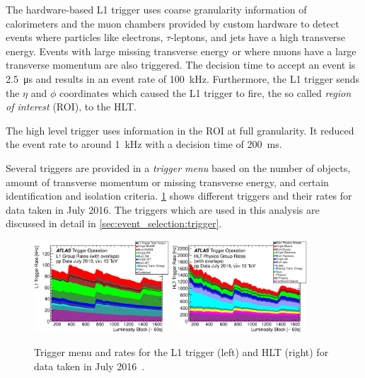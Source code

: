 The hardware-based L1 trigger uses coarse granularity information of calorimeters and the muon chambers provided by custom hardware
to detect events where particles like electrons, $\tau$-leptons, and jets have a high transverse energy.
Events with large missing transverse energy or where muons have a large transverse momentum are also triggered.
The decision time to accept an event is \SI{2.5}{\us} and results in an event rate of \SI{100}{\kHz}.
Furthermore, the L1 trigger sends the $\eta$ and $\phi$ coordinates which caused the L1 trigger to fire,
the so called \emph{region of interest} (ROI), to the HLT\@.

The high level trigger uses information in the ROI at full granularity.
It reduced the event rate to around \SI{1}{\kHz} with a decision time of \SI{200}{\ms}.

Several triggers are provided in a \emph{trigger menu} based on the number of objects,
amount of transverse momentum or missing transverse energy, and certain identification and
isolation criteria.
\cref{fig:setup:triggermenu} shows different triggers and their rates for data taken in July 2016.
The triggers which are used in this analysis are discussed in detail in \cref{sec:event_selection:trigger}.

\begin{figure}[htb]
    \centering
    \includegraphics[width=0.45\textwidth]{./figures/setup/l1_trigger_menu_2016.eps}
    \includegraphics[width=0.45\textwidth]{./figures/setup/hlt_trigger_menu_2016.eps}
    \caption{Trigger menu and rates for the L1 trigger (left) and HLT (right) for data taken in July 2016~\cite{TriggerMenu2016}.}\label{fig:setup:triggermenu}
\end{figure}


